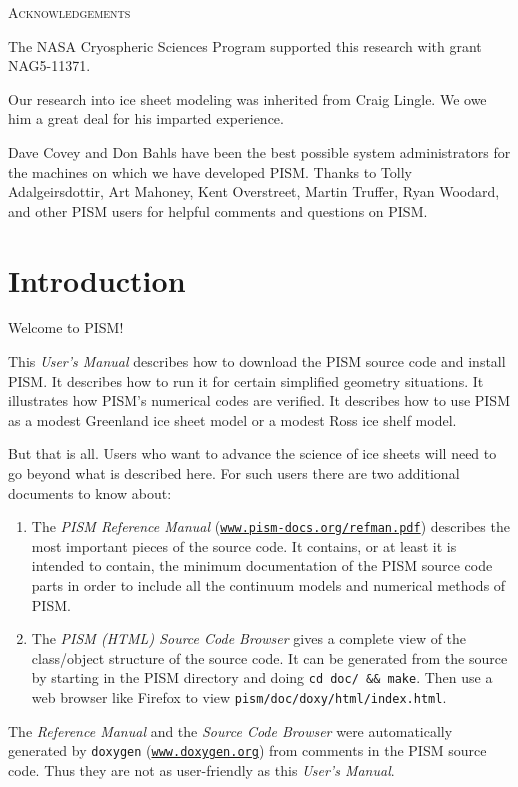 \documentclass[11pt,final]{amsart}
\renewcommand{\t}[1]{\texttt{#1}}
\begin{document}
\centerline{\textsc{Acknowledgements}}
\bigskip

The NASA Cryospheric Sciences Program supported this research with grant NAG5-11371.

Our research into ice sheet modeling was inherited from Craig Lingle.  We owe him a great deal for his imparted experience.

Dave Covey and Don Bahls have been the best possible system administrators for the machines on which we have developed PISM.  Thanks to Tolly Adalgeirsdottir, Art Mahoney, Kent Overstreet, Martin Truffer, Ryan Woodard, and other PISM users for helpful comments and questions on PISM.

\newpage
\setcounter{tocdepth}{2}
\tableofcontents


\newpage
\section{Introduction}\label{sect:intro}

Welcome to PISM!

This \emph{User's Manual} describes how to download the PISM source code and install PISM.  It describes how to run it for certain simplified geometry situations.  It illustrates how PISM's numerical codes are verified.  It describes how to use PISM as a modest Greenland ice sheet model or a modest Ross ice shelf model.

But that is all.  Users who want to advance the science of ice sheets will need to go beyond what is described here.  For such users there are two additional documents to know about:
\begin{enumerate}
 \item  The \emph{PISM Reference Manual} (\href{http://www.pism-docs.org/refman.pdf}{\t{www.pism-docs.org/refman.pdf}})
describes the most important pieces of the source code.  It contains, or at least it is intended to contain, the minimum documentation of the PISM source code parts in order to include all the continuum models and numerical methods of PISM.
 \item  The \emph{PISM (HTML) Source Code Browser} gives a complete view of the class/object structure of the source code.  It can be generated from the source by starting in the PISM directory and doing \verb|cd doc/ && make|. Then use a web browser like Firefox to view \verb|pism/doc/doxy/html/index.html|.
\end{enumerate}
The \emph{Reference Manual} and the \emph{Source Code Browser} were automatically generated by \verb|doxygen| (\href{http://www.doxygen.org/}{\t{www.doxygen.org}}) from comments in the PISM source code.  Thus they are not as user-friendly as this \emph{User's Manual}.
\end{document}
